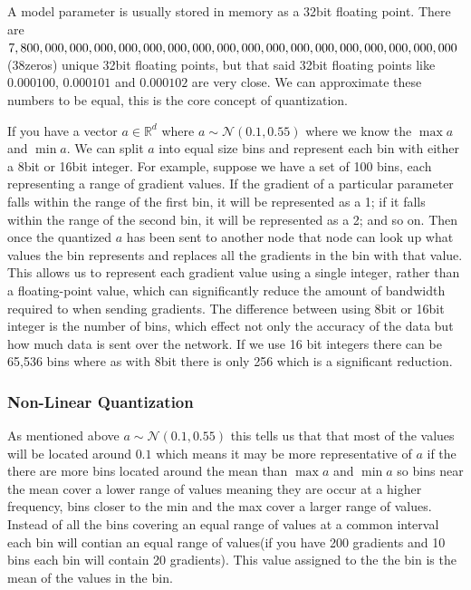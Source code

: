 \documentclass[11pt]{article}
\begin{document}
A model parameter is usually stored in memory as a 32bit floating point. There are $7, 800, 000, 000,\\ 000, 000,000,000,000,000,000,000,000,000,000,000,000,000,000$(38zeros) unique 32bit floating points, but that said 32bit floating points like $0.000100$, $0.000101$ and $0.000102$ are very close. We can approximate these numbers to be equal, this is the core concept of quantization.

If you have a vector $a \in \mathbb{R}^d$ where $a \sim \mathcal{N}(0.1,0.55)$ where we know the $\max a$ and $\min a$. We can split $a$ into equal size bins and represent each bin with either a 8bit or 16bit integer. For example, suppose we have a set of 100 bins, each representing a range of gradient values. If the gradient of a particular parameter falls within the range of the first bin, it will be represented as a 1; if it falls within the range of the second bin, it will be represented as a 2; and so on. Then once the quantized $a$ has been sent to another node that node can look up what values the bin represents and replaces all the gradients in the bin with that value. This allows us to represent each gradient value using a single integer, rather than a floating-point value, which can significantly reduce the amount of bandwidth required to when sending gradients. The difference between using 8bit or 16bit integer is the number of bins, which effect not only the accuracy of the data but how much data is sent over the network. If we use 16 bit integers there can be 65,536 bins where as with 8bit there is only 256 which is a significant reduction.

\subsubsection{Non-Linear Quantization}

As mentioned above $a \sim \mathcal{N}(0.1,0.55)$ this tells us that that most of the values will be located around $0.1$ which means it may be more representative of $a$ if the there are more bins located around the mean than $\max a$ and $\min a$ so bins near the mean cover a lower range of values meaning they are occur at a higher frequency, bins closer to the min and the max cover a larger range of values. Instead of all the bins covering an equal range of values at a common interval each bin will contian an equal range of values(if you have 200 gradients and 10 bins each bin will contain 20 gradients). This value assigned to the the bin is the mean of the values in the bin.
\end{document}
